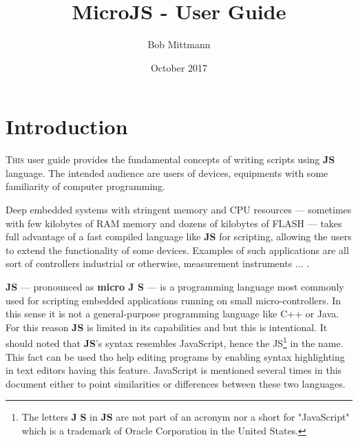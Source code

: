 

\makeatletter         
\title{MicroJS - User Guide}
\author{Bob Mittmann}
\date{October 2017}
\def\email{bobmittmann@gmail.com} %
\def\therevision{0.1} %
\let\thetitle\@title %
\makeatother



\maketitle
\thispagestyle{empty}
\newpage
{}
\tableofcontents
\newpage
\listoffigures
\newpage
\listoftables
\newpage

\begin{versionhistory}
\end{versionhistory}

\newpage
{}

\section{Introduction}

\lettrine{T}{his} user guide provides the fundamental concepts of writing scripts using \textbf{\textmu JS} language. The intended audience are users of devices, equipments with some familiarity of computer programming.

Deep embedded systems with stringent memory and CPU resources --- sometimes with few kilobytes of RAM memory and dozens of kilobytes of FLASH --- takes full advantage of a fast compiled language like \textbf{\textmu JS} for scripting, allowing the users to extend the functionality of some devices. Examples of such applications are all sort of controllers industrial or otherwise, measurement instruments ... .

\textbf{\textmu JS} --- pronounced as \textbf{micro J S} --- is a programming language most commonly used for scripting embedded applications running on small micro-controllers. In this sense it is not a general-purpose programming language like C++ or Java. For this reason \textbf{\textmu JS} is limited in its capabilities and but this is intentional. It should noted that \textbf{\textmu JS}'s syntax resembles JavaScript, hence the JS\footnote{The letters \textbf{J} \textbf{S} in \textbf{\textmu JS} are not part of an acronym nor a short for "JavaScript" which is a trademark of Oracle Corporation in the United States.} in the name. This fact can be used tho help editing programs by enabling syntax highlighting in text editors having this feature. JavaScript is mentioned several times in this document either to point similarities or differences between these two languages. 

